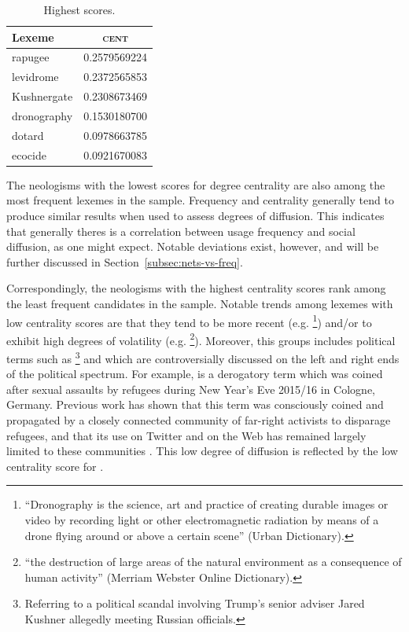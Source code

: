 \documentclass[
  a4paper,
  abstract=on,
  captions=tableabove
  ]{scrartcl}
\begin{document}
\begin{table}
\begin{subtable}{.3\linewidth}
          \centering
          \caption{Highest scores.}
          \begin{tabular}{l S[table-format=1.4, round-mode=places, round-precision=4]}
            \toprule
            Lexeme      & {\textsc{cent}} \\
            \midrule
            rapugee     & 0.2579569224 \\
            levidrome   & 0.2372565853 \\
            Kushnergate	& 0.2308673469 \\
            dronography	& 0.1530180700 \\
            dotard      & 0.0978663785 \\
            ecocide     & 0.0921670083 \\
            \bottomrule
          \end{tabular}
        \end{subtable}
      \end{table}

      The neologisms with the lowest scores for degree centrality are also among the most frequent lexemes in the sample. Frequency and centrality generally tend to produce similar results when used to assess degrees of diffusion. This indicates that generally theres is a correlation between usage frequency and social diffusion, as one might expect. Notable deviations exist, however, and will be further discussed in Section~\ref{subsec:nets-vs-freq}. 

      Correspondingly, the neologisms with the highest centrality scores rank among the least frequent candidates in the sample. Notable trends among lexemes with low centrality scores are that they tend to be more recent (e.g. \footnote{\enquote{Dronography is the science, art and practice of creating durable images or video by recording light or other electromagnetic radiation by means of a drone flying around or above a certain scene} (Urban Dictionary).}) and/or to exhibit high degrees of volatility (e.g. \footnote{\enquote{the destruction of large areas of the natural environment as a consequence of human activity} (Merriam Webster Online Dictionary).}). Moreover, this groups includes political terms such as \footnote{Referring to a political scandal involving Trump's senior adviser Jared Kushner allegedly meeting Russian officials.} and  which are controversially discussed on the left and right ends of the political spectrum. For example,  is a derogatory term which was coined after sexual assaults by refugees during New Year's Eve 2015/16 in Cologne, Germany. Previous work has shown that this term was consciously coined and propagated by a closely connected community of far-right activists to disparage refugees, and that its use on Twitter and on the Web has remained largely limited to these communities \parencite{Wurschinger2016UsingWeb}. This low degree of diffusion is reflected by the low centrality score for .
\end{document}
